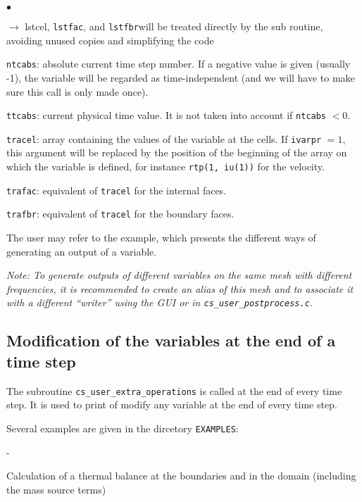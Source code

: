 {{{\begin{list}{$\bullet$}{}
\begin{list}{$\rightarrow$}{}
{lstcel}, \texttt{lstfac}, and \texttt{lstfbr}will be treated directly by
 the sub routine, avoiding unused copies and simplifying the code
         \end{list}
       \item \texttt{ntcabs}: absolute current time step number. If a
             negative value is given (usually -1), the variable will be
             regarded  as time-independent (and we will have to make sure this
             call is only made once).
       \item \texttt{ttcabs}: current physical time value. It is not taken
             into account if \texttt{ntcabs} $< 0$.
       \item \texttt{tracel}: array containing the values of the
             variable at the cells. If \texttt{ivarpr} $= 1$, this
             argument will be replaced by the position of the beginning
             of the array on which the variable is defined, for instance
             \texttt{rtp(1, iu(1))} for the velocity.
       \item \texttt{trafac}: equivalent of \texttt{tracel} for the
             internal faces.
       \item \texttt{trafbr}: equivalent of \texttt{tracel} for the
             boundary faces.
\end{list}

The user may refer to the example, which presents the different ways of
generating an output of a variable.

{\em Note: To
generate outputs of different variables on the same mesh with different
frequencies, it is recommended to create an alias of this mesh and to
associate it with a different ``writer'' using the GUI or in
\texttt{cs\_user\_postprocess.c}.}

\subsection{Modification of the variables at the end of a time step}

The subroutine \texttt{cs\_user\_extra\_operations} is called at the end
of every time step. It is used to print of modify any variable at the end
of every time step.

Several examples are given in the dircetory \texttt{EXAMPLES}:
\begin{list}{-}{}
\item Calculation of a thermal balance at  the boundaries and in the
      domain (including the mass source terms)


\end{list}}}}
